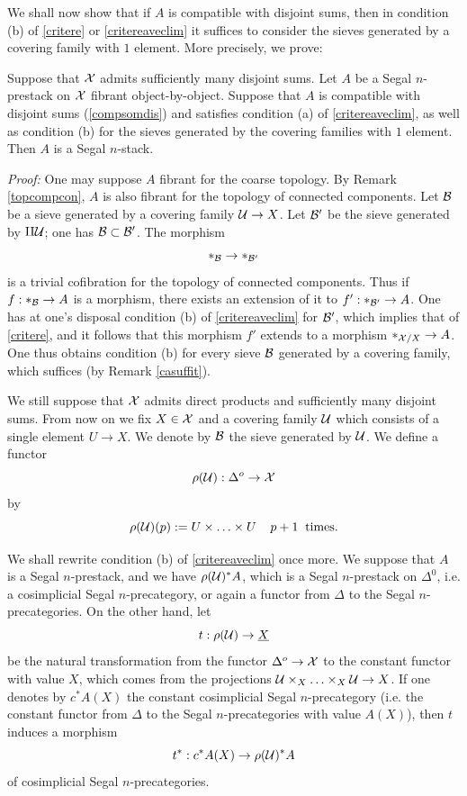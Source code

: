 We shall now show that if $A$ is compatible with disjoint sums, then in
condition (b) of \ref{critere} or \ref{critereaveclim} it suffices to consider
the sieves generated by a covering family with $1$ element. More precisely, we
prove:

\begin{lemma}
\label{unseul}
Suppose that ${\cal X}$ admits sufficiently many disjoint sums.
Let $A$ be a Segal $n$-prestack on ${\cal X}$ fibrant object-by-object.
Suppose that $A$ is compatible with disjoint sums (\ref{compsomdis}) and
satisfies condition (a) of \ref{critereaveclim}, as well as condition (b) for
the sieves generated by the covering families with $1$ element. Then $A$ is a
Segal $n$-stack.
\end{lemma}
{\em Proof:}
One may suppose $A$ fibrant for the coarse topology. By Remark
\ref{topcompcon}, $A$ is also fibrant for the topology of connected components.
Let ${\cal B}$ be a sieve generated by a covering family ${\cal U} \rightarrow X$. Let
${\cal B} '$ be the sieve generated by $\amalg {\cal U}$; one has ${\cal B} \subset {\cal B} '$.
The morphism
$$
\ast _{{\cal B}}\rightarrow \ast _{{\cal B} '}
$$
is a trivial cofibration for the topology of connected components.
Thus if $f:\ast _{{\cal B}}\rightarrow A$ is a morphism, there exists an extension of
it to $f':\ast _{{\cal B} '}\rightarrow A$. One has at one's disposal condition (b)
of \ref{critereaveclim} for ${\cal B} '$, which implies that of \ref{critere}, and it
follows that this morphism $f'$ extends to a morphism
$\ast _{{\cal X} /X}\rightarrow A$. One thus obtains condition (b) for every sieve
${\cal B}$ generated by a covering family, which suffices (by Remark
\ref{casuffit}).
\eop

\bigskip

We still suppose that ${\cal X}$ admits direct products and sufficiently many
disjoint sums. From now on we fix $X\in {\cal X}$ and a covering family ${\cal U}$ which
consists of a single element $U\rightarrow X$. We denote by ${\cal B}$ the sieve
generated by ${\cal U}$. We define a functor
$$
\rho ({\cal U} ): \Delta ^o \rightarrow {\cal X}
$$
by
$$
\rho ({\cal U} )(p):= U\times \ldots \times U \;\;\;\; p+1\;\;
\mbox{times}.
$$

We shall rewrite condition (b) of \ref{critereaveclim} once more. We suppose
that $A$ is a Segal $n$-prestack, and we have $\rho ({\cal U}
)^{\ast }A$, which is a Segal $n$-prestack on $\Delta ^0$, i.e. a cosimplicial
Segal $n$-precategory, or again a functor from $\Delta$ to the Segal
$n$-precategories. On the other hand, let
$$
t: \rho ({\cal U} )\rightarrow \underline{X}
$$
be the natural transformation from the functor $\Delta ^o\rightarrow {\cal X}$ to the
constant functor with value $X$, which comes from the projections ${\cal U} \times
_X\ldots \times _X{\cal U} \rightarrow X$. If one denotes by $c^{\ast} A(X)$ the
constant cosimplicial Segal $n$-precategory (i.e. the constant functor from
$\Delta$ to the Segal $n$-precategories with value $A(X)$), then $t$ induces a
morphism
$$
t^{\ast} : c^{\ast}A(X) \rightarrow  \rho ({\cal U} )^{\ast }A
$$
of cosimplicial Segal $n$-precategories.

